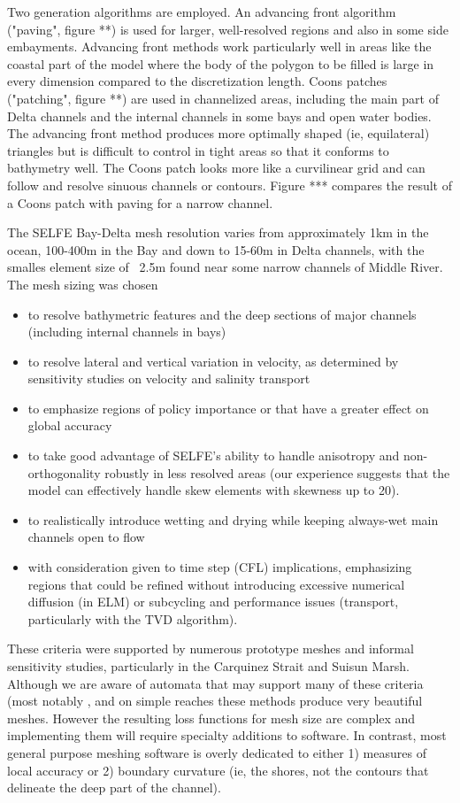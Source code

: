 Two generation algorithms are employed. An advancing front algorithm ("paving", figure **) is used for 
larger, well-resolved regions and also in some side embayments. Advancing front methods work particularly well in areas
like the coastal part of the model where the body of the polygon to be filled is large in every dimension compared
to the discretization length. Coons patches ("patching", figure **) are used in channelized areas, including the main part of Delta channels and the internal channels in some bays and open water bodies. The advancing front method produces more optimally shaped (ie, equilateral) triangles but is difficult to control in tight areas so that it conforms to bathymetry well. The
Coons patch looks more like a curvilinear grid and can follow and resolve sinuous channels or contours. Figure *** compares
the result of a Coons patch with paving for a narrow channel.

The SELFE Bay-Delta mesh resolution varies from approximately 1km in the ocean, 100-400m in the Bay and down to 15-60m in Delta
channels, with the smalles element size of ~2.5m found near some narrow channels of Middle River. The mesh sizing was chosen
\begin{itemize}
	\item to resolve bathymetric features and the deep sections of major channels (including internal channels in bays)
	\item to resolve lateral and vertical variation in velocity, as determined by sensitivity studies on velocity and
	salinity transport
	\item to emphasize regions of policy importance or that have a greater effect on global accuracy
	\item to take good advantage of SELFE's ability to handle anisotropy and non-orthogonality robustly in less resolved areas (our
experience suggests that the model can effectively handle skew elements with skewness up to 20).
	\item to realistically introduce wetting and drying while keeping always-wet main channels open to flow
	\item with consideration given to time step (CFL) implications, emphasizing regions that could be refined without introducing 
	excessive numerical diffusion (in ELM) or subcycling and performance issues (transport, particularly with the TVD algorithm).
\end{itemize}

These criteria were supported by numerous prototype meshes and informal sensitivity studies, 
particularly in the Carquinez Strait and Suisun Marsh. Although we are aware of automata 
that may support many of these criteria (most notably \cite{Persson2004,Persson05}, and
on simple reaches these methods produce very beautiful meshes. However the resulting loss functions
for mesh size are complex and implementing them will require specialty additions to software. 
In contrast, most general purpose meshing software is overly dedicated to either 1) measures of local accuracy
or 2) boundary curvature (ie, the shores, not the contours that delineate the deep part of the channel).
 
